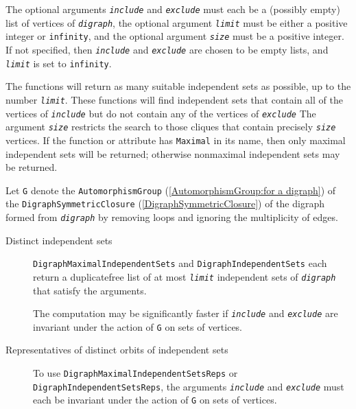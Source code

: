 \documentclass[a4paper,11pt]{report}
\begin{document}
{{{ The optional arguments \mbox{\texttt{\mdseries\slshape include}} and \mbox{\texttt{\mdseries\slshape exclude}} must each be a (possibly empty) list of vertices of \mbox{\texttt{\mdseries\slshape digraph}}, the optional argument \mbox{\texttt{\mdseries\slshape limit}} must be either a positive integer or \texttt{infinity}, and the optional argument \mbox{\texttt{\mdseries\slshape size}} must be a positive integer. If not specified, then \mbox{\texttt{\mdseries\slshape include}} and \mbox{\texttt{\mdseries\slshape exclude}} are chosen to be empty lists, and \mbox{\texttt{\mdseries\slshape limit}} is set to \texttt{infinity}. 

 The functions will return as many suitable independent sets as possible, up to
the number \mbox{\texttt{\mdseries\slshape limit}}. These functions will find independent sets that contain all of the vertices
of \mbox{\texttt{\mdseries\slshape include}} but do not contain any of the vertices of \mbox{\texttt{\mdseries\slshape exclude}} The argument \mbox{\texttt{\mdseries\slshape size}} restricts the search to those cliques that contain precisely \mbox{\texttt{\mdseries\slshape size}} vertices. If the function or attribute has \texttt{Maximal} in its name, then only maximal independent sets will be returned; otherwise
non\texttt{}maximal independent sets may be returned. 

 Let \texttt{G} denote the \texttt{AutomorphismGroup} (\ref{AutomorphismGroup:for a digraph}) of the \texttt{DigraphSymmetricClosure} (\ref{DigraphSymmetricClosure}) of the digraph formed from \mbox{\texttt{\mdseries\slshape digraph}} by removing loops and ignoring the multiplicity of edges. 
\begin{description}
\item[{Distinct independent sets}]  \texttt{DigraphMaximalIndependentSets} and \texttt{DigraphIndependentSets} each return a duplicate\texttt{}free list of at most \mbox{\texttt{\mdseries\slshape limit}} independent sets of \mbox{\texttt{\mdseries\slshape digraph}} that satisfy the arguments.

 The computation may be significantly faster if \mbox{\texttt{\mdseries\slshape include}} and \mbox{\texttt{\mdseries\slshape exclude}} are invariant under the action of \texttt{G} on sets of vertices. 
\item[{Representatives of distinct orbits of independent sets}]  To use \texttt{DigraphMaximalIndependentSetsReps} or \texttt{DigraphIndependentSetsReps}, the arguments \mbox{\texttt{\mdseries\slshape include}} and \mbox{\texttt{\mdseries\slshape exclude}} must each be invariant under the action of \texttt{G} on sets of vertices.


\end{description}}}}
\end{document}
